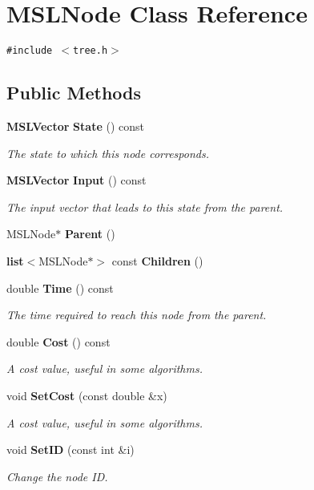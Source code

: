 \section{MSLNode  Class Reference}
\label{classMSLNode}
{\tt \#include $<$tree.h$>$}

\subsection*{Public Methods}
\begin{CompactItemize}
\item 
{\bf MSLVector} {\bf State} () const
\begin{CompactList}\small\item\em The state to which this node corresponds.\item\end{CompactList}\item 
{\bf MSLVector} {\bf Input} () const
\begin{CompactList}\small\item\em The input vector that leads to this state from the parent.\item\end{CompactList}\item 
MSLNode$\ast$ {\bf Parent} ()
\item 
{\bf list}$<$MSLNode$\ast$$>$ const {\bf Children} ()
\item 
double {\bf Time} () const
\begin{CompactList}\small\item\em The time required to reach this node from the parent.\item\end{CompactList}\item 
double {\bf Cost} () const
\begin{CompactList}\small\item\em A cost value, useful in some algorithms.\item\end{CompactList}\item 
void {\bf Set\-Cost} (const double \&x)
\begin{CompactList}\small\item\em A cost value, useful in some algorithms.\item\end{CompactList}\item 
void {\bf Set\-ID} (const int \&i)
\begin{CompactList}\small\item\em Change the node ID.\item\end{CompactList}\item 
$$
\end{CompactItemize}
